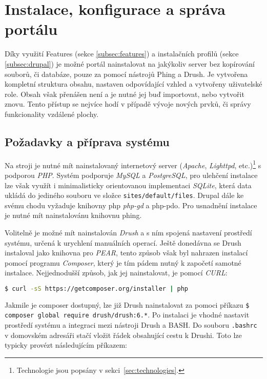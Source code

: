 \chapter{Instalace, konfigurace a správa portálu}
\label{chap:instalace}

Díky využití Features (sekce \ref{subsec:features}) a instalačních profilů (sekce \ref{subsec:drupal}) je možné portál nainstalovat na jakýkoliv server bez kopírování souborů, či databáze, pouze za pomocí nástrojů Phing a Drush. Je vytvořena kompletní struktura obsahu, nastaven odpovídající vzhled a vytvořeny uživatelské role. Obsah však přenášen není a je nutné jej buď importovat, nebo vytvořit znovu. Tento přístup se nejvíce hodí v případě vývoje nových prvků, či správy funkcionality vzdálené plochy.

\section{Požadavky a příprava systému}

Na stroji je nutné mít nainstalovaný internetový server (\emph{Apache}, \emph{Lighttpd}, etc.)\footnote{Technologie jsou popsány v sekci~\ref{sec:technologies}.}  s podporou \emph{PHP}. Systém podporuje \emph{MySQL} a \emph{PostgreSQL}, pro ulehčení instalace lze však využít i minimalisticky orientovanou implementaci \emph{SQLite}, která data ukládá do jediného souboru ve složce \texttt{sites/default/files}. Drupal dále ke svému chodu vyžaduje knihovny php \emph{php-gd} a {php-pdo}. Pro usnadnění instalace je nutné mít nainstalovánu knihovnu phing.

Volitelně je možné mít nainstalován \emph{Drush} a s ním spojená nastavení prostředí systému, určená k urychlení manuálních operací. Ještě donedávna se Drush instaloval jako knihovna pro \emph{PEAR}, tento způsob však byl nahrazen instalací pomocí programu \emph{Composer}, který je tím pádem nutný k započetí samotné instalace. Nejjednodušší způsob, jak jej nainstalovat, je pomocí \emph{CURL}:

\begin{lstlisting}[language=bash]
  $ curl -sS https://getcomposer.org/installer | php
\end{lstlisting}

Jakmile je composer dostupný, lze již Drush nainstalovat za pomoci příkazu \texttt{\$ composer global require drush/drush:6.*}. Po instalaci je vhodné nastavit prostředí systému a integraci mezi nástroji Drush a BASH. Do souboru \texttt{.bashrc} v domovském adresáři stačí vložit řádek obsahující cestu k Drushi. Toto lze typicky provézt následujícím příkazem:

